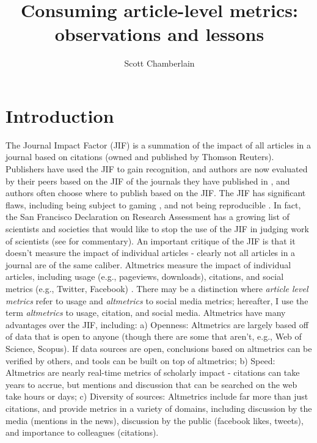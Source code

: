 \documentclass[letterpaper,superscriptaddress,showkeys,longbibliography]{revtex4-1}\usepackage{graphicx, color}
\begin{document}

\title{Consuming article-level metrics: observations and lessons}

\author{Scott Chamberlain}


\maketitle

\section*{Introduction}

The Journal Impact Factor (JIF) \cite{garfield1955,garfield2006} is a summation of the impact of all articles in a journal based on citations (owned and published by Thomson Reuters). Publishers have used the JIF to gain recognition, and authors are now evaluated by their peers based on the JIF of the journals they have published in \cite{monastersky2005}, and authors often choose where to publish based on the JIF. The JIF has significant flaws, including being subject to gaming \cite{ploseditorial}, and not being reproducible \cite{rossner2007}. In fact, the San Francisco Declaration on Research Assessment has a growing list of scientists and societies that would like to stop the use of the JIF in judging work of scientists (see \cite{alberts2013} for commentary). An important critique of the JIF is that it doesn't measure the impact of individual articles - clearly not all articles in a journal are of the same caliber. Altmetrics measure the impact of individual articles, including usage (e.g., pageviews, downloads), citations, and social metrics (e.g., Twitter, Facebook) \cite{priem2012}. There may be a distinction where \emph{article level metrics} refer to usage and \emph{altmetrics} to social media metrics; hereafter, I use the term \emph{altmetrics} to usage, citation, and social media. Altmetrics have many advantages over the JIF, including: a) Openness: Altmetrics are largely based off of data that is open to anyone (though there are some that aren't, e.g., Web of Science, Scopus). If data sources are open, conclusions based on altmetrics can be verified by others, and tools can be built on top of altmetrics; b) Speed: Altmetrics are nearly real-time metrics of scholarly impact \cite{priem2012} - citations can take years to accrue, but mentions and discussion that can be searched on the web take hours or days; c) Diversity of sources: Altmetrics include far more than just citations, and provide metrics in a variety of domains, including discussion by the media (mentions in the news), discussion by the public (facebook likes, tweets), and importance to colleagues (citations).
\end{document}
